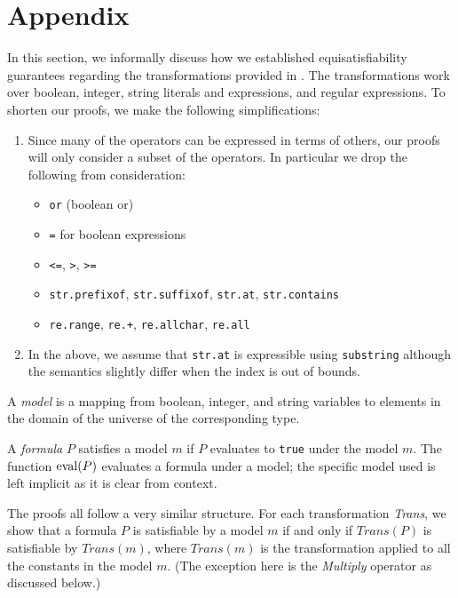 \section{Appendix}

In this section, we informally discuss how we established
equisatisfiability guarantees regarding the transformations provided
in \fuzzer{}.  The transformations work over boolean, integer, string
literals and expressions, and regular expressions. To shorten our
proofs, we make the following simplifications:

\begin{enumerate}
  \item
    Since many of the operators can be expressed in terms of others,
    our proofs will only consider a subset of the operators. In
    particular we drop the following from consideration:
    \begin{itemize}
      \item \texttt{or} (boolean or)
      \item \texttt{=} for boolean expressions
      \item \texttt{<=}, \texttt{>}, \texttt{>=}
      \item \texttt{str.prefixof}, \texttt{str.suffixof}, \texttt{str.at}, \texttt{str.contains}
      \item \texttt{re.range}, \texttt{re.+}, \texttt{re.allchar}, \texttt{re.all}
    \end{itemize}

  \item
    In the above, we assume that \texttt{str.at} is expressible using
    \texttt{substring} although the semantics slightly differ when the index is
    out of bounds.
\end{enumerate}

\begin{definition}
  A \emph{model} is a mapping from boolean, integer, and string variables to
elements in the domain of the universe of the corresponding type.
\end{definition}

\begin{definition}
  A \emph{formula} $P$ satisfies a model $m$ if $P$ evaluates to
  \texttt{true} under the model $m$. The function $\operatorname{eval} (P)$
  evaluates a formula under a model; the specific model used is left
  implicit as it is clear from context.
\end{definition}

The proofs all follow a very similar structure. For each
transformation \textit{Trans}, we show that a formula $P$ is
satisfiable by a model $m$ if and only if $\textit{Trans}(P)$ is
satisfiable by $\textit{Trans}(m)$, where $\textit{Trans}(m)$ is the
transformation applied to all the constants in the model $m$. (The
exception here is the \textit{Multiply} operator as discussed below.)

